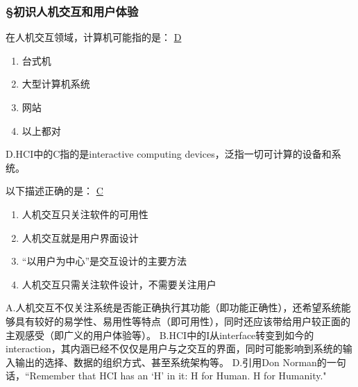 \subsubsection*{\S 初识人机交互和用户体验}
\setcounter{problemname}{0}

\begin{problem}
	‍在人机交互领域，计算机可能指的是：
	\uline{D}    
    \vspace{-0.8em}
    \begin{multicols}{4}
        \begin{enumerate}[label=\Alph*.]
            \item 台式机
            \item 大型计算机系统
            \item 网站
            \item 以上都对
        \end{enumerate}
    \end{multicols}
    \vspace{-1em}
\end{problem}

\begin{solution}
D.HCI中的C指的是interactive computing devices，泛指一切可计算的设备和系统。
\end{solution}


\begin{problem}
	‍以下描述正确的是：
	\uline{C}    
    \vspace{-0.8em}
    \begin{multicols}{2}
        \begin{enumerate}[label=\Alph*.]
            \item 人机交互只关注软件的可用性
            \item 人机交互就是用户界面设计
            \item “以用户为中心”是交互设计的主要方法
            \item 人机交互只需关注软件设计，不需要关注用户
        \end{enumerate}
    \end{multicols}
    \vspace{-1em}
\end{problem}

\begin{solution}
A.人机交互不仅关注系统是否能正确执行其功能（即功能正确性），还希望系统能够具有较好的易学性、易用性等特点（即可用性），同时还应该带给用户较正面的主观感受（即广义的用户体验等）。  B.HCI中的I从interface转变到如今的interaction，其内涵已经不仅仅是用户与之交互的界面，同时可能影响到系统的输入输出的选择、数据的组织方式、甚至系统架构等。  D.引用Don Norman的一句话，``Remember that HCI has an `H' in it: H for Human. H for Humanity."
\end{solution}


